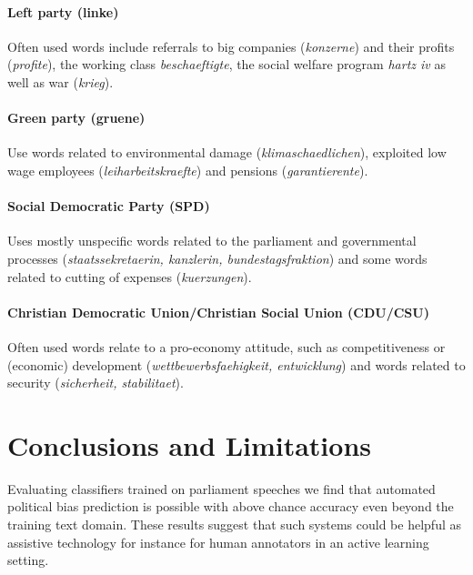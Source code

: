\documentclass[11pt]{article}
\begin{document}
\paragraph{\bf Left party (linke)} Often used words include referrals to big companies ({\em konzerne}) and their profits ({\em profite}), the working class {\em beschaeftigte}, the social welfare program {\em hartz iv} as well as war ({\em krieg}).
\paragraph{\bf Green party (gruene)} Use words related to environmental damage ({\em klimaschaedlichen}), exploited low wage employees ({\em leiharbeitskraefte}) and pensions ({\em garantierente}).
\paragraph{\bf Social Democratic Party (SPD)} Uses mostly unspecific words related to the parliament and governmental processes ({\em staatssekretaerin, kanzlerin, bundestagsfraktion}) and some words related to cutting of expenses ({\em kuerzungen}).
\paragraph{\bf Christian Democratic Union/Christian Social Union (CDU/CSU)}
Often used words relate to a pro-economy attitude, such as competitiveness or (economic) development ({\em wettbewerbsfaehigkeit, entwicklung}) and words related to security ({\em sicherheit, stabilitaet}). 

\section{Conclusions and Limitations}\label{sec:conclusion}
Evaluating classifiers trained on parliament speeches we find that automated political bias prediction is possible with above chance accuracy even beyond the training text domain. These results suggest that such systems could be helpful as assistive technology for instance for human annotators in an active learning setting. 
\end{document}
